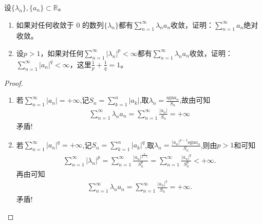 \documentclass[../../main.tex]{subfiles}
\begin{document}
\begin{example}
设$\{ \lambda_n \},\{ a_n \} \subset \mathbb{R}$。
\begin{enumerate}
\item 如果对任何收敛于 0 的数列$\{ \lambda_n \}$都有$\sum_{n=1}^{\infty} \lambda_n a_n$收敛，证明：$\sum_{n=1}^{\infty} a_n$绝对收敛。

\item 设$p > 1$，如果对任何$\sum_{n=1}^{\infty} |\lambda_n|^p < \infty$都有$\sum_{n=1}^{\infty} \lambda_n a_n$收敛，证明：$\sum_{n=1}^{\infty} |a_n|^q < \infty$，这里$\frac{1}{p} + \frac{1}{q} = 1$。
\end{enumerate}
\end{example}
\begin{proof}
\begin{enumerate}
\item 若$\sum_{n=1}^{\infty}{| a_n |}=+\infty$,记$S_n=\sum_{k=1}^n{| a_k |}$,取$\lambda _n=\frac{\mathrm{sgn} a_n}{S_n}$,故由可知
\begin{align*}
\sum_{n=1}^{\infty}{\lambda _na_n}=\sum_{n=1}^{\infty}{\frac{| a_n |}{S_n}}=+\infty
\end{align*}
矛盾!

\item 若$\sum_{n=1}^{\infty}{| a_n |^q}=+\infty$,记$S_n=\sum_{k=1}^n{| a_k |^q}$,取$\lambda _n=\frac{| a_n |^{q-1}\mathrm{sgn} a_n}{S_n}$,则由$p>1$和可知
\begin{align*}
\sum_{n=1}^{\infty}{| \lambda _n |^p}=\sum_{n=1}^{\infty}{\frac{| a_n |^{\frac{p}{p-1}}}{S_{n}^{p}}}=\sum_{n=1}^{\infty}{\frac{| a_n |^q}{S_{n}^{p}}}<+\infty.
\end{align*}
再由可知
\begin{align*}
\sum_{n=1}^{\infty}{\lambda _na_n}=\sum_{n=1}^{\infty}{\frac{| a_n |^q}{S_n}}=+\infty.
\end{align*}
矛盾!
\end{enumerate}

\end{proof}
\end{document}
